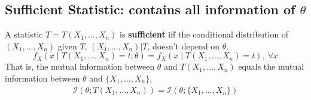 \documentclass[11pt]{elegantbook}
\begin{document}
\subsection{Sufficient Statistic: contains all information of $\theta$}
\begin{definition}
    \normalfont
    A statistic $T=T(X_1,...,X_n)$ is \textbf{sufficient} iff the conditional distribution of $(X_1,...,X_n)$ given $T$, $(X_1,...,X_n)|T$, doesn't depend on $\theta$.
    $$f_X(x\mid T(X_1,...,X_n)=t;\theta)=f_X(x\mid T(X_1,...,X_n)=t),\ \forall x$$
    That is, the mutual information between $\theta$ and $T(X_1,...,X_n)$ equals the mutual information between $\theta$ and $\{X_1,...,X_n\}$,
    \begin{equation}
        \begin{aligned}
            \mathcal{I}(\theta;T(X_1,...,X_n))=\mathcal{I}(\theta;\{X_1,...,X_n\})
        \end{aligned}
        \nonumber
    \end{equation}
\end{definition}
\end{document}
